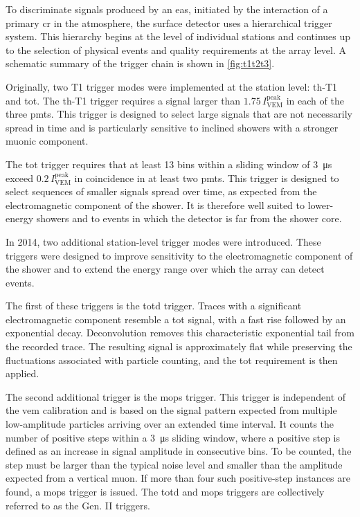 \documentclass[main.tex]{subfiles}
\begin{document}
To discriminate signals produced by an \gls{eas}, initiated by the interaction of a primary \gls{cr} in the atmosphere, the surface detector uses a hierarchical trigger system.
This hierarchy begins at the level of individual stations and continues up to the selection of physical events and quality requirements at the array level.
A schematic summary of the trigger chain is shown in \cref{fig:t1t2t3}.

Originally, two T1 trigger modes were implemented at the station level: \gls{th}-T1 and \gls{tot}.
The \gls{th}-T1 trigger requires a signal larger than $1.75\,I_{\text{VEM}}^{\text{peak}}$ in each of the three \gls{pmt}s.
This trigger is designed to select large signals that are not necessarily spread in time and is particularly sensitive to inclined showers with a stronger muonic component.

The \gls{tot} trigger requires that at least 13 bins within a sliding window of \SI{3}{\micro\s} exceed $0.2\,I_{\text{VEM}}^{\text{peak}}$ in coincidence in at least two \gls{pmt}s.
This trigger is designed to select sequences of smaller signals spread over time, as expected from the electromagnetic component of the shower.
It is therefore well suited to lower-energy showers and to events in which the detector is far from the shower core.

In 2014, two additional station-level trigger modes were introduced.
These triggers were designed to improve sensitivity to the electromagnetic component of the shower and to extend the energy range over which the array can detect events.

The first of these triggers is the \gls{totd} trigger.
Traces with a significant electromagnetic component resemble a \gls{tot} signal, with a fast rise followed by an exponential decay.
Deconvolution removes this characteristic exponential tail from the recorded trace.
The resulting signal is approximately flat while preserving the fluctuations associated with particle counting, and the \gls{tot} requirement is then applied.

The second additional trigger is the \gls{mops} trigger.
This trigger is independent of the \gls{vem} calibration and is based on the signal pattern expected from multiple low-amplitude particles arriving over an extended time interval.
It counts the number of positive steps within a \SI{3}{\micro\s} sliding window, where a positive step is defined as an increase in signal amplitude in consecutive bins.
To be counted, the step must be larger than the typical noise level and smaller than the amplitude expected from a vertical muon.
If more than four such positive-step instances are found, a \gls{mops} trigger is issued.
The \gls{totd} and \gls{mops} triggers are collectively referred to as the Gen. II triggers.
\end{document}
